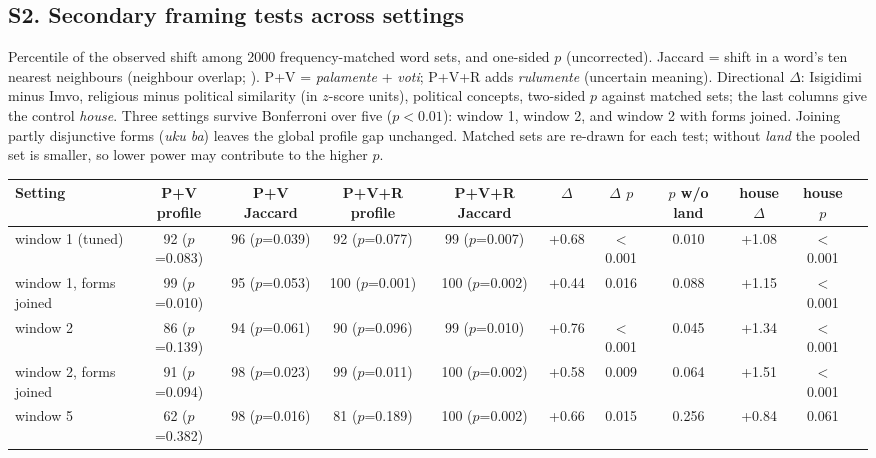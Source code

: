 \documentclass[10pt,letterpaper]{article}
\begin{document}
\subsection*{S2. Secondary framing tests across settings}
Percentile of the observed shift among 2000 frequency-matched word sets, and one-sided $p$ (uncorrected). Jaccard = shift in a word's ten nearest neighbours (neighbour overlap; \citealp{gonen2020}). P+V = \emph{palamente} + \emph{voti}; P+V+R adds \emph{rulumente} (uncertain meaning). Directional $\Delta$: Isigidimi minus Imvo, religious minus political similarity (in $z$-score units), political concepts, two-sided $p$ against matched sets; the last columns give the control \emph{house}. Three settings survive Bonferroni over five ($p<0.01$): window 1, window 2, and window 2 with forms joined. Joining partly disjunctive forms (\emph{uku ba}) leaves the global profile gap unchanged. Matched sets are re-drawn for each test; without \emph{land} the pooled set is smaller, so lower power may contribute to the higher $p$.\\[2pt]
\begin{tabular}{@{}lcccccccccc@{}}
\toprule
Setting & P+V profile & P+V Jaccard & P+V+R profile & P+V+R Jaccard & $\Delta$ & $\Delta$ $p$ & $p$ w/o land & house $\Delta$ & house $p$ \\ \midrule
window 1 (tuned) & 92 ($p$=0.083) & 96 ($p$=0.039) & 92 ($p$=0.077) & 99 ($p$=0.007) & +0.68 & $<$0.001 & 0.010 & +1.08 & $<$0.001 \\
window 1, forms joined & 99 ($p$=0.010) & 95 ($p$=0.053) & 100 ($p$=0.001) & 100 ($p$=0.002) & +0.44 & 0.016 & 0.088 & +1.15 & $<$0.001 \\
window 2 & 86 ($p$=0.139) & 94 ($p$=0.061) & 90 ($p$=0.096) & 99 ($p$=0.010) & +0.76 & $<$0.001 & 0.045 & +1.34 & $<$0.001 \\
window 2, forms joined & 91 ($p$=0.094) & 98 ($p$=0.023) & 99 ($p$=0.011) & 100 ($p$=0.002) & +0.58 & 0.009 & 0.064 & +1.51 & $<$0.001 \\
window 5 & 62 ($p$=0.382) & 98 ($p$=0.016) & 81 ($p$=0.189) & 100 ($p$=0.002) & +0.66 & 0.015 & 0.256 & +0.84 & 0.061 \\
\bottomrule
\end{tabular}
\end{document}
